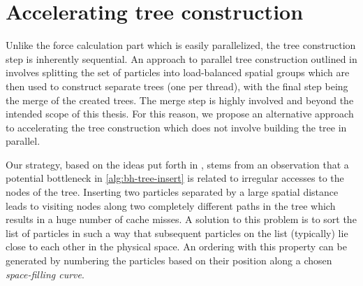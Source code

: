 \section{Accelerating tree construction}
Unlike the force calculation part which is easily parallelized, the tree construction step is inherently sequential.
An approach to parallel tree construction outlined in \cite{warren_salmon_1993} involves splitting the set of particles into load-balanced spatial groups which are then used to construct separate trees (one per thread), with the final step being the merge of the created trees.
The merge step is highly involved and beyond the intended scope of this thesis.
For this reason, we propose an alternative approach to accelerating the tree construction which does not involve building the tree in parallel.

Our strategy, based on the ideas put forth in \cite{warren_salmon_1993}, stems from an observation that a potential bottleneck in \autoref{alg:bh-tree-insert} is related to irregular accesses to the nodes of the tree.
Inserting two particles separated by a large spatial distance leads to visiting nodes along two completely different paths in the tree which results in a huge number of cache misses.
A solution to this problem is to sort the list of particles in such a way that subsequent particles on the list (typically) lie close to each other in the physical space.
An ordering with this property can be generated by numbering the particles based on their position along a chosen \textit{space-filling curve}.

